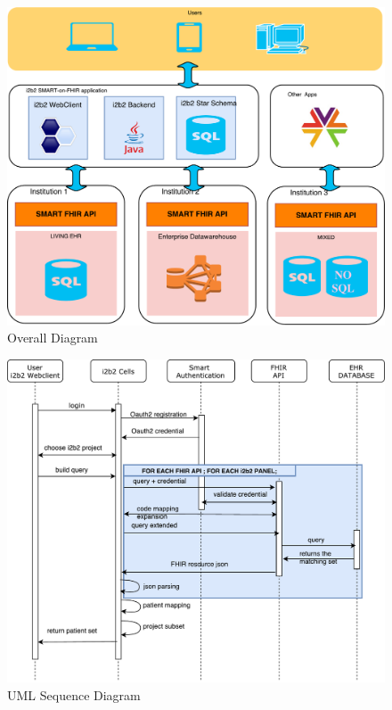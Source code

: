 \documentclass{amia}
\begin{document}
\begin{figure}[h]
\centering
\includegraphics[scale=.4]{overall.pdf}
	\caption{Overall Diagram}
\label{fig1}
\end{figure}

\begin{figure}[h]
\centering
\includegraphics[scale=.5]{diagram_sequence.pdf}
\caption{UML Sequence Diagram}
\label{fig1}
\end{figure}
\end{document}

